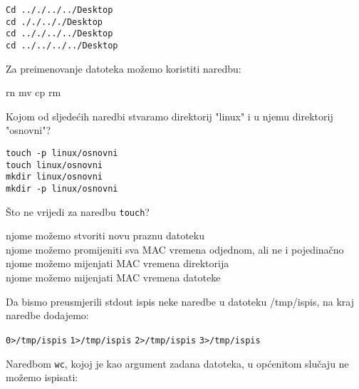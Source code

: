 \documentclass[a4paper,11pt]{exam}
\newcommand{\shell}[1]{\texttt{#1}}
\begin{document}
\begin{questions}
	\begin{oneparchoices}
		\choice \shell{Cd .././../../Desktop} \\
		\choice \shell{cd ././.././Desktop} \\
		\CorrectChoice \shell{cd .././../../Desktop} \\
		\choice \shell{cd ../../../../Desktop}
	\end{oneparchoices}
	
	\question	
	Za preimenovanje datoteka možemo koristiti naredbu:
	
	\begin{oneparchoices}
		\choice rn
		\CorrectChoice mv
		\choice cp
		\choice rm
	\end{oneparchoices}
	
	\question
	Kojom od sljedećih naredbi stvaramo direktorij "linux" i u njemu direktorij "osnovni"? 
	
	\begin{oneparchoices}
		\choice \shell{touch -p linux/osnovni} \\
		\choice \shell{touch linux/osnovni} \\
		\choice \shell{mkdir linux/osnovni} \\
		\CorrectChoice \shell{mkdir -p linux/osnovni}
	\end{oneparchoices}
	
	\question
	Što ne vrijedi za naredbu \shell{touch}?
	
	\begin{oneparchoices}
		\choice njome možemo stvoriti novu praznu datoteku \\
		\CorrectChoice njome možemo promijeniti sva MAC vremena odjednom, ali ne i pojedinačno \\
		\choice njome možemo mijenjati MAC vremena direktorija \\
		\choice njome možemo mijenjati MAC vremena datoteke
	\end{oneparchoices}
	
	\question
	Da bismo preusmjerili stdout ispis neke naredbe u datoteku /tmp/ispis, na kraj naredbe dodajemo: 
	
	\begin{oneparchoices}
		\choice \shell{0>/tmp/ispis} 
		\CorrectChoice \shell{1>/tmp/ispis} 
		\choice \shell{2>/tmp/ispis} 
		\choice \shell{3>/tmp/ispis}
	\end{oneparchoices}
	
	\question
	Naredbom \shell{wc}, kojoj je kao argument zadana datoteka, u općenitom slučaju ne možemo ispisati:
	

\end{questions}
\end{document}
